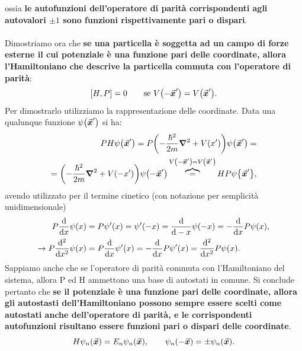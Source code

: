 ossia \textbf{le autofunzioni dell'operatore di parità corrispondenti agli autovalori $\pm1$ sono funzioni rispettivamente pari o dispari}.\\
\\
Dimostriamo ora che \textbf{se una particella è soggetta ad un campo di forze esterne il cui potenziale è una funzione pari delle coordinate, allora l'Hamiltoniano che descrive la particella commuta con l'operatore di parità}:
\begin{equation}
  \comm{H}{P} = 0 \qquad \text{se } V\qty(-\va*{x}')= V\qty(\va*{x}') .
\end{equation}
Per dimostrarlo utilizziamo la rappresentazione delle coordinate. Data una qualunque funzione $\psi\qty(\va*{x}')$ si ha:
\begin{align}
  PH\psi\qty(\va*{x}') = P\qty(-\frac{\hbar^2}{2m}\grad^2+V\qty(x'))\psi\qty(\va*{x}') =\nonumber\\
  =\qty(-\frac{\hbar^2}{2m}\grad^2+V\qty(-x'))\psi\qty(-\va*{x}') \overbrace{=}^{ V\qty(-\va*{x}')=V\qty(\va*{x}')} HP\psi\qty{\va*{x}'}  ,
\end{align}
avendo utilizzato per il termine cinetico (con notazione per semplicità unidimensionale)
\begin{align}
  P\dv{x}\psi(x)&=P\psi'(x)= \psi'(-x)=\dv{-x}\psi(-x)=-\dv{x}P\psi(x),\\
  \to P\dv[2]{x}\psi(x)&= P\dv{x}\psi'(x) = -\dv{x}P\psi'(x)= \dv[2]{x}P\psi(x) .
\end{align}
Sappiamo anche che se l'operatore di parità commuta con l'Hamiltoniano del sistema, allora P ed H ammettono una base di autostati in comune. Si conclude pertanto che \textbf{se il potenziale è una funzione pari delle coordinate, allora gli autostasti dell'Hamiltoniano possono sempre essere scelti come autostati anche dell'operatore di parità, e le corrispondenti autofunzioni risultano essere funzioni pari o dispari delle coordinate}.
\begin{equation}
  H\psi_n\qty(\va*{x})=E_n\psi_n\qty(\va*{x}), \qquad \psi_n\qty(-\va*{x})=\pm\psi_n\qty(\va*{x}) .
\end{equation}
